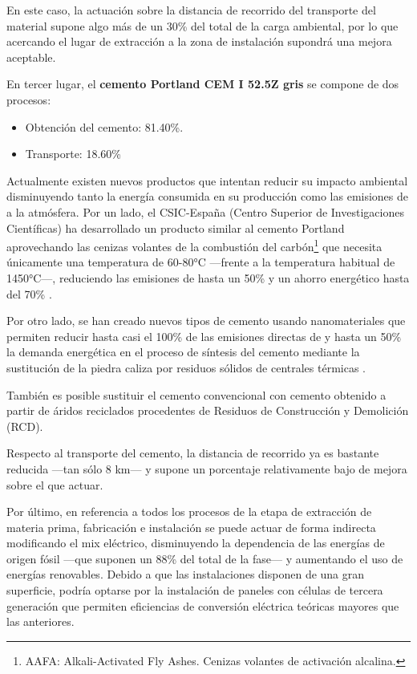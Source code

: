 En este caso, la actuación sobre la distancia de recorrido del transporte del material supone algo más de un 30\% del total de la carga ambiental, por lo que acercando el lugar de extracción a la zona de instalación supondrá una mejora aceptable.

En tercer lugar, el \textbf{cemento Portland CEM I 52.5Z gris} se compone de dos procesos:
\begin{itemize}
  \item Obtención del cemento: 81.40\%.
  \item Transporte: 18.60\%
\end{itemize}

Actualmente existen nuevos productos que intentan reducir su impacto ambiental disminuyendo tanto la energía consumida en su producción como las emisiones de  a la atmósfera. Por un lado, el CSIC-España (Centro Superior de Investigaciones Científicas) ha desarrollado un producto similar al cemento Portland aprovechando las cenizas volantes de la combustión del carbón\footnote{AAFA: Alkali-Activated Fly Ashes. Cenizas volantes de activación alcalina.} que necesita únicamente una temperatura de 60-80\si{\celsius} —frente a la temperatura habitual de 1450\si{\celsius}—, reduciendo las emisiones de  hasta un 50\% y un ahorro energético hasta del 70\% \cite{csic}.

Por otro lado, se han creado nuevos tipos de cemento usando nanomateriales que permiten reducir hasta casi el 100\% de las emisiones directas de  y hasta un 50\% la demanda energética en el proceso de síntesis del cemento mediante la sustitución de la piedra caliza por residuos sólidos de centrales térmicas \cite{website:tecnalia}.

También es posible sustituir el cemento convencional con cemento obtenido a partir de áridos reciclados procedentes de Residuos de Construcción y Demolición (RCD).

Respecto al transporte del cemento, la distancia de recorrido ya es bastante reducida —tan sólo 8 \si{km}— y supone un porcentaje relativamente bajo de mejora sobre el que actuar.

Por último, en referencia a todos los procesos de la etapa de extracción de materia prima, fabricación e instalación se puede actuar de forma indirecta modificando el mix eléctrico, disminuyendo la dependencia de las energías de origen fósil —que suponen un 88\% del total de la fase— y aumentando el uso de energías renovables. Debido a que las instalaciones disponen de una gran superficie, podría optarse por la instalación de paneles con células de tercera generación que permiten eficiencias de conversión eléctrica teóricas mayores que las anteriores.

